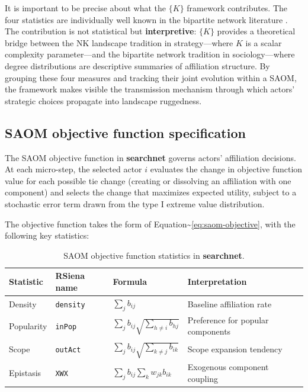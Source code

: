 \documentclass[
]{article}
\begin{document}
It is important to be precise about what the \(\{K\}\) framework
contributes. The four statistics are individually well known in the
bipartite network literature \citep{Latapy2008, BorgattiEverett1997}.
The contribution is not statistical but \textbf{interpretive}: \(\{K\}\)
provides a theoretical bridge between the NK landscape tradition in
strategy---where \(K\) is a scalar complexity parameter---and the
bipartite network tradition in sociology---where degree distributions
are descriptive summaries of affiliation structure. By grouping these
four measures and tracking their joint evolution within a SAOM, the
framework makes visible the transmission mechanism through which actors'
strategic choices propagate into landscape ruggedness.

\subsection{SAOM objective function specification}\label{sec:objective}

The SAOM objective function in \textbf{searchnet} governs actors'
affiliation decisions. At each micro-step, the selected actor \(i\)
evaluates the change in objective function value for each possible tie
change (creating or dissolving an affiliation with one component) and
selects the change that maximizes expected utility, subject to a
stochastic error term drawn from the type I extreme value distribution.

The objective function takes the form of
Equation\textasciitilde{}\ref{eq:saom-objective}, with the following key
statistics:

\begin{table}[t]
\centering
\caption{SAOM objective function statistics in \textbf{searchnet}.}
\label{tab:effects}
\begin{tabular}{llll}
\toprule
Statistic & RSiena name & Formula & Interpretation \\
\midrule
Density & \texttt{density} & $\sum_j b_{ij}$ & Baseline affiliation rate \\
Popularity & \texttt{inPop} & $\sum_j b_{ij} \sqrt{\sum_{h \neq i} b_{hj}}$ & Preference for popular components \\
Scope & \texttt{outAct} & $\sum_j b_{ij} \sqrt{\sum_{k \neq j} b_{ik}}$ & Scope expansion tendency \\
Epistasis & \texttt{XWX} & $\sum_j b_{ij} \sum_k w_{jk} b_{ik}$ & Exogenous component coupling \\
\bottomrule
\end{tabular}
\end{table}
\end{document}
